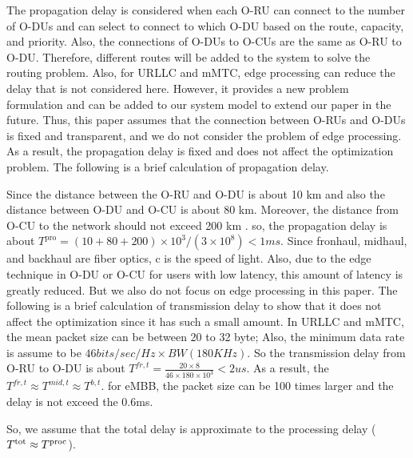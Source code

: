 \documentclass[lettersize,journal]{IEEEtran}
\begin{document}
The propagation delay is considered when each O-RU can connect to the number of O-DUs and can select to connect to which O-DU based on the route, capacity, and priority. Also, the connections of O-DUs to O-CUs are the same as O-RU to O-DU. Therefore, different routes will be added to the system to solve the routing problem. Also, for URLLC and mMTC, edge processing can reduce the delay that is not considered here.
However, it provides a new problem formulation and can be added to our system model to extend our paper in the future. Thus, this paper assumes that the connection between O-RUs and O-DUs is fixed and transparent, and we do not consider the problem of edge processing. As a result, the propagation delay is fixed and does not affect the optimization problem. The following is a brief calculation of propagation delay.

Since the distance between the O-RU and O-DU is about 10 km and also the distance between O-DU and O-CU is about 80 km. Moreover, the distance from O-CU to the network should not exceed 200 km \cite{oranD1}. so, the propagation delay is about $T^{\text{pro}} = (10 + 80 + 200)\times 10^3 /(3\times 10^8) < 1ms $. Since fronhaul, midhaul, and backhaul are fiber optics, c is the speed of light. Also, due to the edge technique in O-DU or O-CU for users with low latency, this amount of latency is greatly reduced. But we also do not focus on edge processing in this paper.
The following is a brief calculation of transmission delay to show that it does not affect the optimization since it has such a small amount.
In URLLC and mMTC, the mean packet size can be between 20 to 32 byte; Also, the minimum data rate is assume to be $46 bits/sec/Hz \times BW (180 KHz)$. So the transmission delay from O-RU to O-DU is about $T^{fr,t} = \frac{20\times 8}{46 \times 180 \times 10^3} < 2 us$. As a result, the $T^{fr,t} \approx T^{mid,t} \approx T^{b,t}$. for eMBB, the packet size can be 100 times larger and the delay is not exceed the 0.6ms.


So, we assume that the total delay is approximate to the processing delay ($T^{\text{\text{tot}}} \approx T^{\text{proc}}$).
\end{document}

